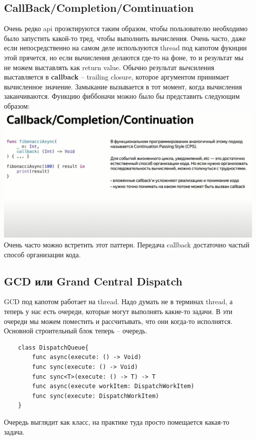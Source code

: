 \documentclass{article}
\begin{document}
    \subsection{CallBack/Completion/Comtinuation}
    Очень редко api проэктируются таким образом, чтобы пользователю необходимо было запустить какой-то тред, чтобы выполнить вычисления. Очень часто, даже если непосредственно на самом деле используются thread под капотом фукнции этой прячется, но если вычисления делаются где-то на фоне, то и результат мы не можем выставлять как return value. Обычно результат вычсиления выставляется в \textbf{callback} -- trailing closure, которое аргументом принимает вычисленное значение. Замыкание вызывается в тот момент, когда вычисления заканчиваются. Функцию фиббоначи можно было бы представить следующим образом: 
    \newline
    \includegraphics[scale = 0.3]{pic/Снимок экрана 2023-08-04 в 13.43.06.png}
    \newline
    Очень часто можно встретить этот паттерн. Передача callback достаточно частый способ организации кода. 
    \subsection{GCD или Grand Central Dispatch}
    GCD под капотом работает на thread. Надо думать не в терминах thread, а теперь у нас есть очереди, которые могут выполнять какие-то задачи. В эти очереди мы можем поместить и рассчитывать, что они когда-то исполнятся. Основной строительный блок теперь -- очередь. 
    \newline
    \begin{verbatim}
    class DispatchQueue{
        func async(execute: () -> Void)
        func sync(execute: () -> Void)
        func sync<T>(execute: () -> T) -> T
        func async(execute workItem: DispatchWorkItem)
        func sync(execute: DispatchWorkItem)
    }
    \end{verbatim}
    Очередь выглядит как класс, на практике туда просто помещается какая-то задача. 
    
\end{document}
